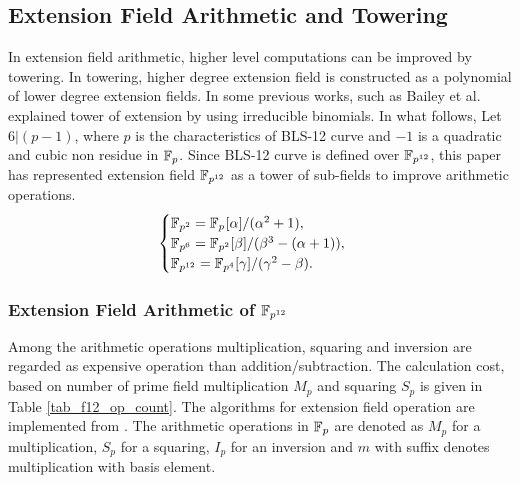 \subsection{Extension Field Arithmetic and Towering}
In extension field arithmetic, higher level computations can be improved by towering. In towering, higher degree extension field is  constructed as a polynomial of lower degree extension fields.
In some previous works, such as Bailey et al. \cite{OEF} explained tower of extension by using irreducible binomials. 
In what follows, Let $6|(p-1)$, where $p$ is the characteristics of BLS-12 curve and $-1$ is a quadratic and cubic non residue in ${\mathbb{F}}_{p}$. 
Since BLS-12 curve is defined over $\FPTV$, this paper has represented extension field  $\FPTV$ as a tower of sub-fields to improve arithmetic operations.
\begin{equation}\label{BN_towering}
\begin{cases}
{\mathbb{F}}_{p^{2}} = {\mathbb{F}}_{p^{}}[\alpha]/(\alpha^2+1),  \\ 
{\mathbb{F}}_{p^{6}} = {\mathbb{F}}_{p^{2}}[\beta]/(\beta^3-(\alpha+1)),  \\ 
{\mathbb{F}}_{p^{12}} = {\mathbb{F}}_{p^{4}}[\gamma]/(\gamma^2-\beta). \\ 
\end{cases}
\end{equation}

\subsubsection*{Extension Field Arithmetic of $\FPTV$}
Among the arithmetic operations multiplication, squaring and inversion are regarded as expensive operation than addition/subtraction. The calculation cost, based on number of prime field multiplication $M_p$ and squaring $S_p$ is given in Table \ref{tab_f12_op_count}. The algorithms for extension field operation are implemented from \cite{sylvain_bn}. The arithmetic operations in ${\mathbb{F}}_{p}$ are denoted as $M_p$ for a multiplication, $S_p$ for a squaring, $I_p$ for an inversion and $m$ with suffix denotes multiplication with basis element.

\begin{table*}[t]
\caption{Number of arithmetic operations in $\FPTV$ based on \eqref{BN_towering}}
\label{tab_f12_op_count}
\centering
{}
\end{table*}

